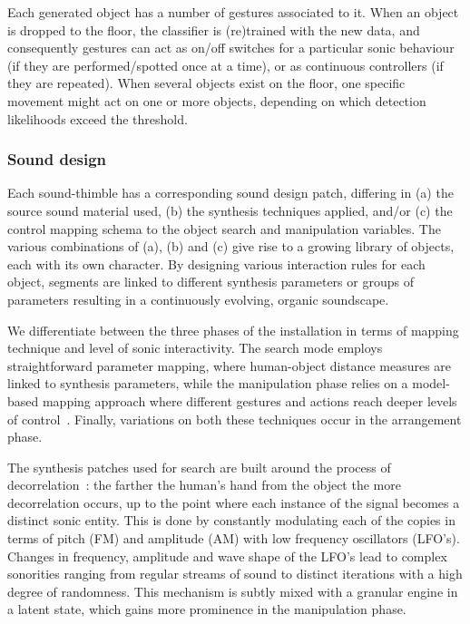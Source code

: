 \documentclass{nime-alternate}
\begin{document}
Each generated object has a number of gestures associated to it. When an object is dropped to the floor, the classifier is (re)trained with the new data, and consequently gestures can act as on/off switches for a particular sonic behaviour (if they are performed/spotted once at a time), or as continuous controllers (if they are repeated). When several objects exist on the floor, one specific movement might act on one or more objects, depending on which detection likelihoods exceed the threshold. 


\subsubsection{Sound design}


Each sound-thimble has a corresponding sound design patch, differing in (a) the source sound material used, (b) the synthesis techniques applied, and/or (c) the control mapping schema to the object search and manipulation variables. The various combinations of (a), (b) and (c) give rise to a growing library of objects, each with its own character. By designing various interaction rules for each object, segments are linked to different synthesis parameters or groups of parameters resulting in a continuously evolving, organic soundscape.

We differentiate between the three phases of the installation in terms of mapping technique and level of sonic interactivity. The search mode employs straightforward parameter mapping, where human-object distance measures are linked to synthesis parameters, while the manipulation phase relies on a model-based mapping approach where different gestures and actions reach deeper levels of control~\cite{hermann2011sonification}. Finally, variations on both these techniques occur in the arrangement phase.


The synthesis patches used for search are built around the process of decorrelation~\cite{101}: the farther the human's hand from the object the more decorrelation occurs, up to the point where each instance of the signal becomes a distinct sonic entity. This is done by constantly modulating each of the copies in terms of pitch (FM) and amplitude (AM) with low frequency oscillators (LFO’s). Changes in frequency, amplitude and wave shape of the LFO’s lead to complex sonorities ranging from regular streams of sound to distinct iterations with a high degree of randomness. %
This mechanism is subtly mixed with a granular engine in a latent state, which gains more prominence in the manipulation phase.
\end{document}

